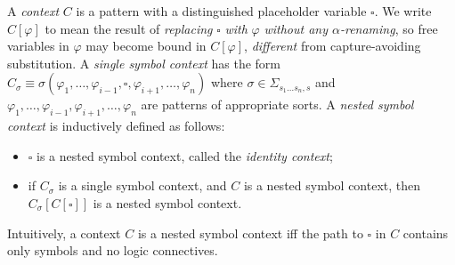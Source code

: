 \documentclass{almostllncs}
\begin{document}
\begin{definition} \label{def:context}
	
A \emph{context} $C$ is a pattern with a distinguished placeholder variable $\square$.
We write $C[\varphi]$ to mean the result of \emph{replacing} 
$\square$ \emph{with} $\varphi$ \emph{without any $\alpha$-renaming}, so
free variables in $\varphi$ may become bound in $C[\varphi]$,
\emph{different} from capture-avoiding substitution.
A \emph{single symbol context} has the form
$C_\sigma \equiv \sigma(\varphi_1,\dots,\varphi_{i-1},\square,\varphi_{i+1},\dots,\varphi_n)$
where $\sigma \in \Sigma_{s_1 \dots s_n , s}$
and $\varphi_1,\dots,\varphi_{i-1},\varphi_{i+1},\dots,\varphi_n$ are patterns of appropriate sorts.
A \emph{nested symbol context} is inductively defined as follows:
\begin{itemize}
\item $\square$ is a nested symbol context, called the \emph{identity context};
\item if $C_\sigma$ is a single symbol context, and $C$ is a nested symbol context, then $C_\sigma[C[\square]]$ is a nested symbol context.
\end{itemize}
\noindent
Intuitively, a context $C$ is a nested symbol context iff the path to $\square$ 
in $C$ contains only symbols and no logic connectives.

\end{definition}
\end{document}
